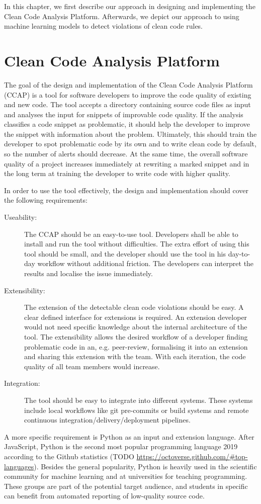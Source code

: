 In this chapter, we first describe our approach in designing and implementing the Clean Code Analysis Platform. Afterwards, we depict our approach to using machine learning models to detect violations of clean code rules.

\section{Clean Code Analysis Platform}
The goal of the design and implementation of the Clean Code Analysis Platform (CCAP) is a tool for software developers to improve the code quality of existing and new code. The tool accepts a directory containing source code files as input and analyses the input for snippets of improvable code quality. If the analysis classifies a code snippet as problematic, it should help the developer to improve the snippet with information about the problem. Ultimately, this should train the developer to spot problematic code by its own and to write clean code by default, so the number of alerts should decrease. At the same time, the overall software quality of a project increases immediately at rewriting a marked snippet and in the long term at training the developer to write code with higher quality.

In order to use the tool effectively, the design and implementation should cover the following requirements:
\begin{description}
    \item[Useability:]  The CCAP should be an easy-to-use tool. Developers shall be able to install and run the tool without difficulties. The extra effort of using this tool should be small, and the developer should use the tool in his day-to-day workflow without additional friction. The developers can interpret the results and localise the issue immediately.
    \item[Extensibility:] The extension of the detectable clean code violations should be easy. A clear defined interface for extensions is required. An extension developer would not need specific knowledge about the internal architecture of the tool. The extensibility allows the desired workflow of a developer finding problematic code in an, e.g. peer-review, formalising it into an extension and sharing this extension with the team. With each iteration, the code quality of all team members would increase.
    \item[Integration:] The tool should be easy to integrate into different systems. These systems include local workflows like git pre-commits or build systems and remote continuous integration/delivery/deployment pipelines.
\end{description}
A more specific requirement is Python as an input and extension language. After JavaScript, Python is the second most popular programming language 2019 according to the Github statistics (TODO \url{https://octoverse.github.com/#top-languages}). Besides the general popularity, Python is heavily used in the scientific community for machine learning and at universities for teaching programming. These groups are part of the potential target audience, and students in specific can benefit from automated reporting of low-quality source code.

